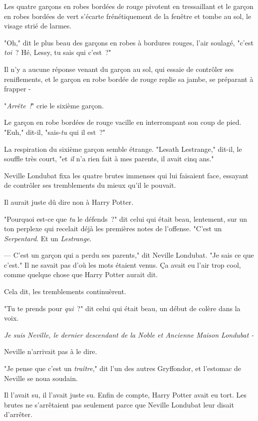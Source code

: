 Les quatre garçons en robes bordées de rouge pivotent en tressaillant et le garçon en robes bordées de vert s'écarte frénétiquement de la fenêtre et tombe au sol, le visage strié de larmes.

"Oh," dit le plus beau des garçons en robes à bordures rouges, l'air soulagé, "c'est \emph{toi}~? Hé, Lessy, tu sais qui c'est~?"

Il n'y a aucune réponse venant du garçon au sol, qui essaie de contrôler ses reniflements, et le garçon en robe bordée de rouge replie sa jambe, se préparant à frapper -

"\emph{Arrête~!}" crie le sixième garçon.

Le garçon en robe bordées de rouge vacille en interrompant son coup de pied. "Euh," dit-il, "sais-\emph{tu} qui il est~?"

La respiration du sixième garçon semble étrange. "Lesath Lestrange," dit-il, le souffle très court, "et \emph{il} n'a rien fait à mes parents, il avait cinq ans."

\later

Neville Londubat fixa les quatre brutes immenses qui lui faisaient face, essayant de contrôler ses tremblements du mieux qu'il le pouvait.

Il aurait juste dû dire non à Harry Potter.

"Pourquoi est-ce que \emph{tu} le défends~?" dit celui qui était beau, lentement, sur un ton perplexe qui recelait déjà les premières notes de l'offense. "C'est un \emph{Serpentard}. Et un \emph{Lestrange}.

--- C'est un garçon qui a perdu ses parents," dit Neville Londubat. "Je sais ce que c'est." Il ne savait pas d'où les mots étaient venus. Ça avait eu l'air trop cool, comme quelque chose que Harry Potter aurait dit.

Cela dit, les tremblements continuèrent.

"Tu te prends pour \emph{qui}~?" dit celui qui était beau, un début de colère dans la voix.

\emph{Je suis Neville, le dernier descendant de la Noble et Ancienne Maison Londubat -}

Neville n'arrivait pas à le dire.

"Je pense que c'est un \emph{traître}," dit l'un des autres Gryffondor, et l'estomac de Neville se noua soudain.

Il l'avait su, il l'avait juste su. Enfin de compte, Harry Potter avait eu tort. Les brutes ne s'arrêtaient pas seulement parce que Neville Londubat leur disait d'arrêter.

